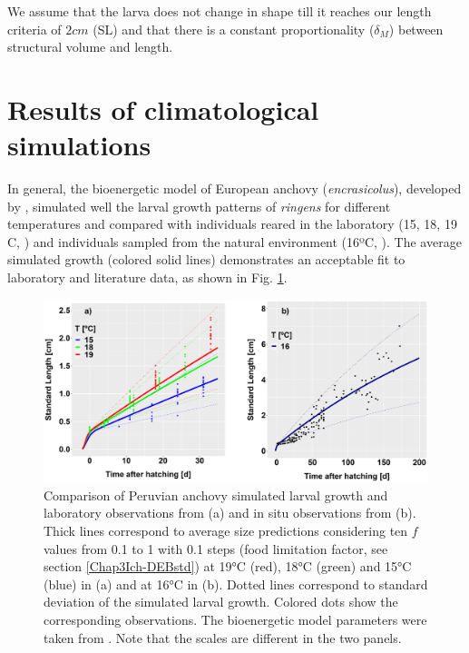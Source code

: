 We assume that the larva does not change in shape till it reaches our length criteria of $2cm$ (SL) and that there is a constant proportionality ($\delta_{M}$) between structural volume and length.\\


\clearpage
\section{Results of climatological simulations}\label{Chap3Resu1}

In general, the bioenergetic model of European anchovy (\textit{\gls{encrasicolus}}), developed by \cite{PethRoos2013}, simulated well the larval growth patterns of \textit{\gls{ringens}} for different temperatures and compared with individuals reared in the laboratory (15, 18, 19 \textdegree C, \cite{RiouOfel2021}) and individuals sampled from the natural environment (16ºC, \cite{MoreClar2011}). The average simulated growth (colored solid lines) demonstrates an acceptable fit to laboratory and literature data, as shown in Fig. \ref{Chap3DEBvsData}.

\begin{figure}[H]
	\includegraphics[width=1.0\textwidth]{figures/Chap3DEBvsData.png}
	\centering
	\caption{Comparison of Peruvian anchovy simulated larval growth and laboratory
observations from \cite{RiouOfel2021} (a) and in situ observations from \cite{MoreClar2011}
(b). Thick lines correspond to average size predictions considering ten $f$ values from 0.1 to 1
with 0.1 steps (food limitation factor, see section \ref{Chap3Ich-DEBstd}) at 19°C (red), 18°C (green) and 15°C (blue) in (a) and at 16°C in (b). Dotted lines correspond to standard deviation of the simulated larval growth. Colored dots show the corresponding observations. The bioenergetic model
parameters were taken from \cite{PethRoos2013}. Note that the scales are different in the
two panels.}
	\label{Chap3DEBvsData}
\end{figure}

